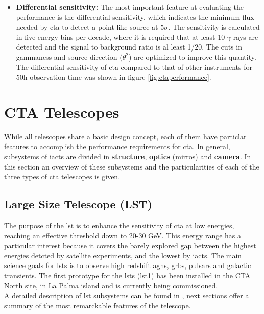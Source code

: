 \documentclass[main.tex]{subfiles}
\begin{document}
\begin{itemize}
\item \textbf{Differential sensitivity:} The most important feature at evaluating the performance is the differential sensitivity, which indicates the minimum flux needed by \gls{cta} to detect a point-like source at $5\sigma$. The sensitivity is calculated in five energy bins per decade, where it is required that at least 10 $\gamma$-rays are detected and the signal to background ratio is al least 1/20. The cuts in gammaness and source direction ($\theta^2$) are optimized to improve this quantity. The differential sensitivity of \gls{cta} compared to that of other instruments for 50h observation time was shown in figure \ref{fig:ctaperformance}.\\
  
\end{itemize}

\section{CTA Telescopes} \label{sec:ctatelescopes}

While all telescopes share a basic design concept, each of them have particlar features to accomplish the performance requirements for \gls{cta}. In general, subsystems of \glspl{iact} are divided in \textbf{structure}, \textbf{optics} (mirros) and \textbf{camera}. 
In this section an overview of these subsystems and the particularities of each of the three types of \gls{cta} telescopes is given. 

\subsection{Large Size Telescope (LST)}

The purpose of the \gls{lst} is to enhance the sensitivity of \gls{cta} at low energies, reaching an effective threshold down to 20-30 GeV. This energy range has a particular interest because it covers the barely explored gap between the highest energies detcted by satellite experiments, and the lowest by \glspl{iact}. The main science goals for \glspl{lst} is to observe high redshift \glspl{agn}, \glspl{grb}, pulsars and galactic transients. The first prototype for the \glspl{lst} (\gls{lst}1) has been installed in the CTA North site, in La Palma island and is currently being commissioned.\\
A detailed description of \gls{lst} subsystems can be found in \cite{2013LST}, next sections offer a summary of the most remarckable features of the telescope.\\
\end{document}
